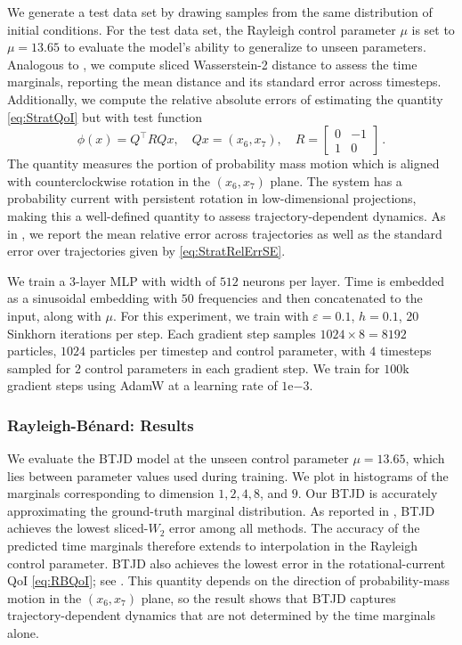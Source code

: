 \documentclass[oneside,11pt]{article}
\theoremstyle{remark}
\begin{document}
We generate a test data set by drawing samples from the same distribution of initial conditions. 
   For the test data set, the Rayleigh control parameter $\mu$ is set to $\mu = 13.65$ to evaluate the model's ability to generalize to unseen parameters. Analogous to , we compute sliced Wasserstein-2 distance to assess the time marginals, reporting the mean distance and its standard error across timesteps.
Additionally, we compute the relative absolute errors of estimating the quantity \eqref{eq:StratQoI} but with test function \begin{equation}\label{eq:RBQoI}
        \phi(x) = Q^\top RQ x, \quad Qx = (x_6,x_7), \quad R = \begin{bmatrix}
            0 & -1 \\
            1 & 0
        \end{bmatrix}\,.
    \end{equation}
    The quantity measures the portion of probability mass motion which is aligned with counterclockwise rotation in the $(x_6,x_7)$ plane. 
    The system has a  probability current with persistent rotation in low-dimensional projections, making this a well-defined quantity to assess trajectory-dependent dynamics. As in , we report the mean relative error across trajectories as well as the standard error over trajectories given by \eqref{eq:StratRelErrSE}.

We train a $3$-layer MLP with width of $512$ neurons per layer. Time is embedded as a sinusoidal embedding with $50$ frequencies and then concatenated to the input, along with $\mu$. For this experiment, we train with $\varepsilon = 0.1$, $h=0.1$, $20$ Sinkhorn iterations per step. Each gradient step samples $1024 \times 8 = 8192$ particles, $1024$ particles per timestep and control parameter, with $4$ timesteps sampled for $2$ control parameters in each gradient step. We train for $100$k gradient steps using AdamW at a learning rate of $1\mathrm{e}{-3}$.


\subsubsection{Rayleigh-Bénard: Results} 
We evaluate the BTJD model at the unseen control parameter $\mu=13.65$, which lies between parameter values used during training. We plot in  histograms of the marginals corresponding to dimension $1, 2, 4, 8$, and $9$. Our BTJD is accurately approximating the ground-truth marginal distribution. As reported in , BTJD achieves the lowest sliced-$W_2$ error among all methods. The accuracy of the predicted time marginals therefore extends to interpolation in the Rayleigh control parameter. BTJD also achieves the lowest error in the rotational-current QoI \eqref{eq:RBQoI}; see . This quantity depends on the direction of probability-mass motion in the $(x_6,x_7)$ plane, so the result shows that BTJD captures trajectory-dependent dynamics that are not determined by the time marginals alone. 
\end{document}
